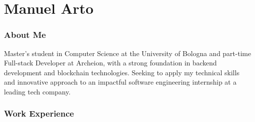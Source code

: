\documentclass{tccv}
\begin{document}
\part{Manuel Arto}

\section{About Me}

Master's student in Computer Science at the University of Bologna and part-time Full-stack Developer at Archeion, with a strong foundation in backend development and blockchain technologies.\newline
Seeking to apply my technical skills and innovative approach to an impactful software engineering internship at a leading tech company.

\section{Work Experience}
\end{document}
